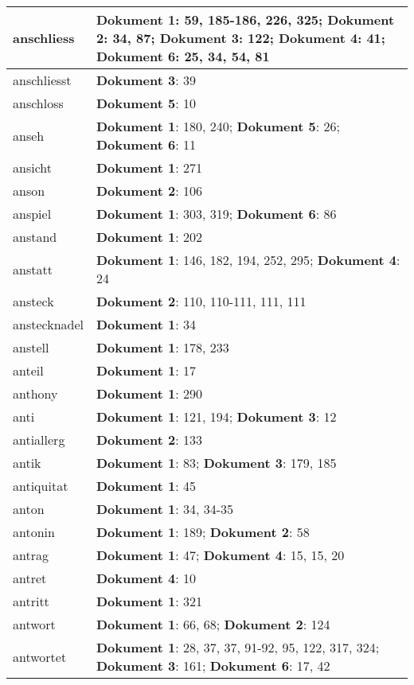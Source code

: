 \documentclass[a5paper]{article}
\begin{document}
\begin{longtable}[l]{|l|p{3in}|}
\hline
anschliess & \textbf{Dokument 1}: 59, 185-186, 226, 325; \textbf{Dokument 2}: 34, 87; \textbf{Dokument 3}: 122; \textbf{Dokument 4}: 41; \textbf{Dokument 6}: 25, 34, 54, 81 \\
\hline
anschliesst & \textbf{Dokument 3}: 39 \\
\hline
anschloss & \textbf{Dokument 5}: 10 \\
\hline
anseh & \textbf{Dokument 1}: 180, 240; \textbf{Dokument 5}: 26; \textbf{Dokument 6}: 11 \\
\hline
ansicht & \textbf{Dokument 1}: 271 \\
\hline
anson & \textbf{Dokument 2}: 106 \\
\hline
anspiel & \textbf{Dokument 1}: 303, 319; \textbf{Dokument 6}: 86 \\
\hline
anstand & \textbf{Dokument 1}: 202 \\
\hline
anstatt & \textbf{Dokument 1}: 146, 182, 194, 252, 295; \textbf{Dokument 4}: 24 \\
\hline
ansteck & \textbf{Dokument 2}: 110, 110-111, 111, 111 \\
\hline
anstecknadel & \textbf{Dokument 1}: 34 \\
\hline
anstell & \textbf{Dokument 1}: 178, 233 \\
\hline
anteil & \textbf{Dokument 1}: 17 \\
\hline
anthony & \textbf{Dokument 1}: 290 \\
\hline
anti & \textbf{Dokument 1}: 121, 194; \textbf{Dokument 3}: 12 \\
\hline
antiallerg & \textbf{Dokument 2}: 133 \\
\hline
antik & \textbf{Dokument 1}: 83; \textbf{Dokument 3}: 179, 185 \\
\hline
antiquitat & \textbf{Dokument 1}: 45 \\
\hline
anton & \textbf{Dokument 1}: 34, 34-35 \\
\hline
antonin & \textbf{Dokument 1}: 189; \textbf{Dokument 2}: 58 \\
\hline
antrag & \textbf{Dokument 1}: 47; \textbf{Dokument 4}: 15, 15, 20 \\
\hline
antret & \textbf{Dokument 4}: 10 \\
\hline
antritt & \textbf{Dokument 1}: 321 \\
\hline
antwort & \textbf{Dokument 1}: 66, 68; \textbf{Dokument 2}: 124 \\
\hline
antwortet & \textbf{Dokument 1}: 28, 37, 37, 91-92, 95, 122, 317, 324; \textbf{Dokument 3}: 161; \textbf{Dokument 6}: 17, 42 \\

\end{longtable}
\end{document}
